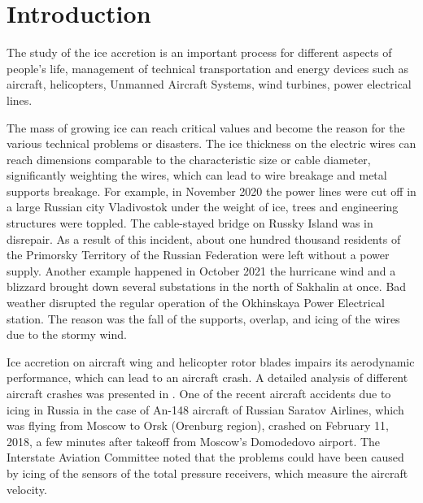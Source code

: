 \documentclass[aerospace,article,submit,moreauthors,pdftex]{Definitions/mdpi}
\begin{document}
\setcounter{section}{0} %


\section{Introduction}

The study of the ice accretion is an important process for different aspects of people’s life, management of technical transportation and energy devices such as aircraft, helicopters, Unmanned Aircraft Systems, wind turbines, power electrical lines. 

The mass of growing ice can reach critical values and become the reason for the various technical problems or disasters. 
The ice thickness on the electric wires can reach dimensions comparable to the characteristic size or cable diameter, significantly weighting the wires, which can lead to wire breakage and metal supports breakage. For example, in November 2020 the power lines were cut off in a large Russian city Vladivostok under the weight of ice, trees and engineering structures were toppled. The cable-stayed bridge on Russky Island was in disrepair. As a result of this incident, about one hundred thousand residents of the Primorsky Territory of the Russian Federation were left without a power supply. Another example happened in October 2021 the hurricane wind and a blizzard brought down several substations in the north of Sakhalin at once. Bad weather disrupted the regular operation of the Okhinskaya Power Electrical station. The reason was the fall of the supports, overlap, and icing of the wires due to the stormy wind.  

Ice accretion on aircraft wing and helicopter rotor blades impairs its aerodynamic performance, which can lead to an aircraft crash. A detailed analysis of different aircraft crashes was presented in \cite{CaoTanWu2018}. One of the recent aircraft accidents due to icing in Russia in the case of An-148 aircraft of Russian Saratov Airlines, which was flying from Moscow to Orsk (Orenburg region), crashed on February 11, 2018, a few minutes after takeoff from Moscow's Domodedovo airport. The Interstate Aviation Committee noted \cite{IAC2018} that the problems could have been caused by icing of the sensors of the total pressure receivers, which measure the aircraft velocity.    
 
\end{document}
